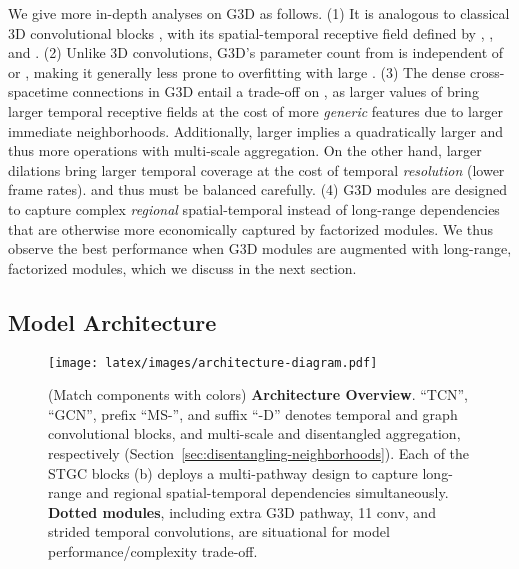 \documentclass[10pt,twocolumn,letterpaper]{article}
\makeatletter
\renewcommand{\paragraph}{\@startsection{paragraph}{4}{\z@}{1.5ex \@plus 1ex \@minus .2ex}{-1em}{\normalfont\normalsize\bfseries}}
\makeatother
\begin{document}
\paragraph{Discussion.}
We give more in-depth analyses on G3D as follows.
(1) It is analogous to classical 3D convolutional blocks \cite{3d-conv-original}, with its spatial-temporal receptive field defined by , , and .
(2) Unlike 3D convolutions, G3D's parameter count from  is independent of  or , making it generally less prone to overfitting with large .
(3) The dense cross-spacetime connections in G3D entail a trade-off on , as larger values of  bring larger temporal receptive fields at the cost of more \textit{generic} features due to larger immediate neighborhoods. Additionally, larger  implies a quadratically larger  and thus more operations with multi-scale aggregation.
On the other hand, larger dilations  bring larger temporal coverage at the cost of temporal \textit{resolution} (lower frame rates).  and  thus must be balanced carefully.
(4) G3D modules are designed to capture complex \textit{regional} spatial-temporal instead of long-range dependencies that are otherwise more economically captured by factorized modules. We thus observe the best performance when G3D modules are augmented with long-range, factorized modules, which we discuss in the next section.












\subsection{Model Architecture}

\begin{figure*}[h]
\texttt{[image: latex/images/architecture-diagram.pdf]}
   \caption{(Match components with colors) \textbf{Architecture Overview}. ``TCN'', ``GCN'', prefix ``MS-'', and suffix ``-D'' denotes temporal and graph convolutional blocks, and multi-scale and disentangled aggregation, respectively (Section~\ref{sec:disentangling-neighborhoods}). Each of the  STGC blocks (b) deploys a multi-pathway design to capture long-range and regional spatial-temporal dependencies simultaneously.
   \textbf{Dotted modules}, including extra G3D pathway, 11 conv, and strided temporal convolutions, are situational for model performance/complexity trade-off.
    }
\label{fig:architecture}
\end{figure*}
\end{document}
